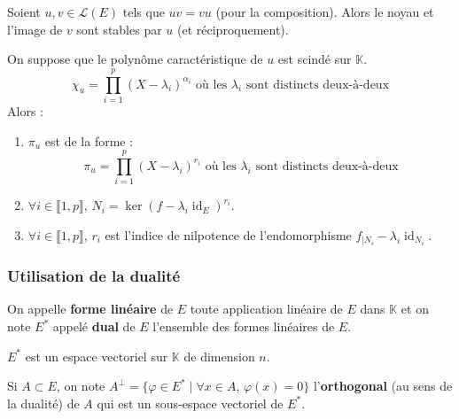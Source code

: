   \begin{proposition}
    Soient $u, v \in \mathcal{L}(E)$ tels que $uv = vu$ (pour la composition). Alors le noyau et l'image de $v$ sont stables par $u$ (et réciproquement).
  \end{proposition}


  \begin{proposition}
    On suppose que le polynôme caractéristique de $u$ est scindé sur $\mathbb{K}$.
    \[ \chi_u = \prod_{i=1}^p (X - \lambda_i)^{\alpha_i} \text{ où les } \lambda_i \text{ sont distincts deux-à-deux} \]
    Alors :
    \begin{enumerate}[label=(\roman*)]
      \item $\pi_u$ est de la forme :
      \[ \pi_u = \prod_{i=1}^p (X - \lambda_i)^{r_i} \text{ où les } \lambda_i \text{ sont distincts deux-à-deux} \]
      \item $\forall i \in \llbracket 1, p \rrbracket$, $N_i = \ker{(f - \lambda_i \operatorname{id}_E )^{r_i}}$.
      \item $\forall i \in \llbracket 1, p \rrbracket$, $r_i$ est l'indice de nilpotence de l'endomorphisme $f_{|N_i} - \lambda_i \operatorname{id}_{N_i}$.
    \end{enumerate}
  \end{proposition}

  \subsubsection{Utilisation de la dualité}


  \begin{definition}
    On appelle \textbf{forme linéaire} de $E$ toute application linéaire de $E$ dans $\mathbb{K}$ et on note $E^*$ appelé \textbf{dual} de $E$ l'ensemble des formes linéaires de $E$.
  \end{definition}

  \begin{proposition}
    $E^*$ est un espace vectoriel sur $\mathbb{K}$ de dimension $n$.
  \end{proposition}

  \begin{definition}
    Si $A \subset E$, on note $A^\perp = \{ \varphi \in E^* \mid \forall x \in A, \, \varphi(x) = 0 \}$ l'\textbf{orthogonal} (au sens de la dualité) de $A$ qui est un sous-espace vectoriel de $E^*$.
  \end{definition}


